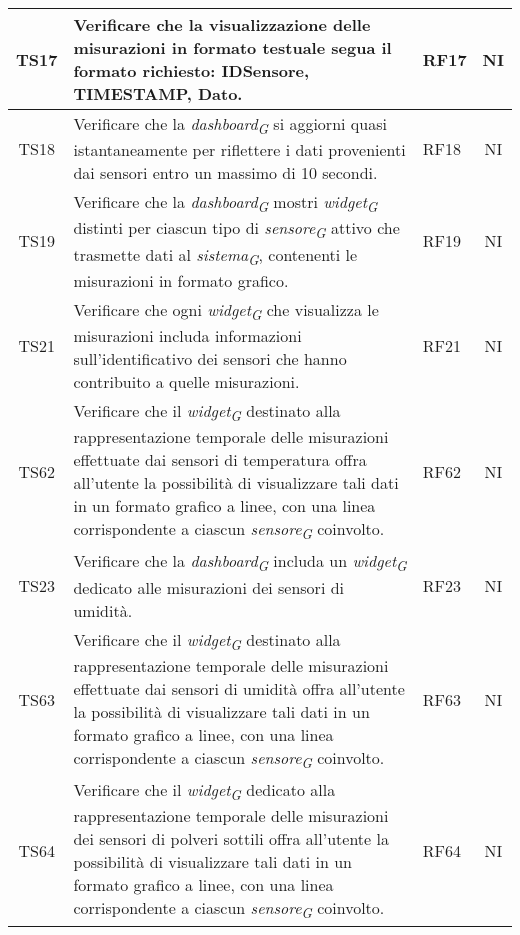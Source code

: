 \begin{longtable}{|c|p{5cm}|>{\raggedright}p{2cm}|c|}
        \hline
        TS17 & Verificare che la visualizzazione delle misurazioni in formato testuale segua il formato richiesto: IDSensore, TIMESTAMP, Dato. & RF17 & NI \\
        \hline
        TS18 & Verificare che la \textit{dashboard}\textsubscript{\textit{G}} si aggiorni quasi istantaneamente per riflettere i dati provenienti dai sensori entro un massimo di 10 secondi. & RF18 & NI \\
        \hline
        TS19 & Verificare che la \textit{dashboard}\textsubscript{\textit{G}} mostri \textit{widget}\textsubscript{\textit{G}} distinti per ciascun tipo di \textit{sensore}\textsubscript{\textit{G}} attivo che trasmette dati al \textit{sistema}\textsubscript{\textit{G}}, contenenti le misurazioni in formato grafico. & RF19 & NI \\
        \hline
        TS21 & Verificare che ogni \textit{widget}\textsubscript{\textit{G}} che visualizza le misurazioni includa informazioni sull'identificativo dei sensori che hanno contribuito a quelle misurazioni. & RF21 & NI \\
        \hline
        TS62 & Verificare che il \textit{widget}\textsubscript{\textit{G}} destinato alla rappresentazione temporale delle misurazioni effettuate dai sensori di temperatura offra all'utente la possibilità di visualizzare tali dati in un formato grafico a linee, con una linea corrispondente a ciascun \textit{sensore}\textsubscript{\textit{G}} coinvolto. & RF62 & NI \\
        \hline
        TS23 & Verificare che la \textit{dashboard}\textsubscript{\textit{G}} includa un \textit{widget}\textsubscript{\textit{G}} dedicato alle misurazioni dei sensori di umidità. & RF23 & NI \\
        \hline
        TS63 & Verificare che il \textit{widget}\textsubscript{\textit{G}} destinato alla rappresentazione temporale delle misurazioni effettuate dai sensori di umidità offra all'utente la possibilità di visualizzare tali dati in un formato grafico a linee, con una linea corrispondente a ciascun \textit{sensore}\textsubscript{\textit{G}} coinvolto. & RF63 & NI \\
        \hline
        TS64 & Verificare che il \textit{widget}\textsubscript{\textit{G}} dedicato alla rappresentazione temporale delle misurazioni dei sensori di polveri sottili offra all'utente la possibilità di visualizzare tali dati in un formato grafico a linee, con una linea corrispondente a ciascun \textit{sensore}\textsubscript{\textit{G}} coinvolto. & RF64 & NI \\

\end{longtable}

